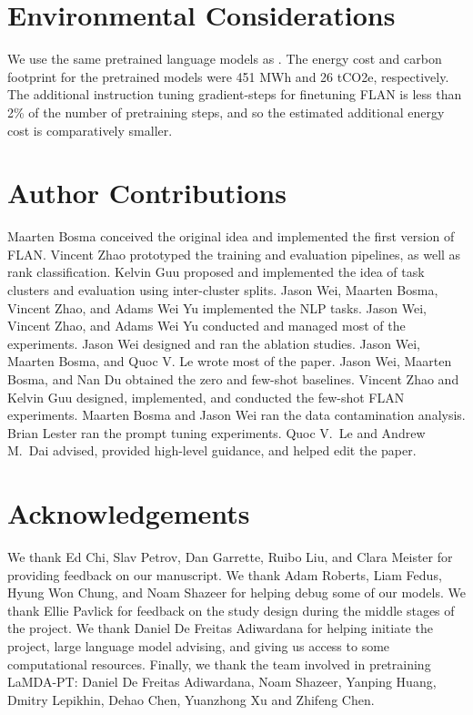 \documentclass{article} \usepackage{iclr2022_conference,times}
\newcommand{\flan}{FLAN}
\newcommand{\baselm}{LaMDA-PT}
\begin{document}
\section*{Environmental Considerations}
We use the same pretrained language models as \citet{Austin2021ProgramSW}. The energy cost and carbon footprint for the pretrained models were 451 MWh and 26 tCO2e, respectively. 
The additional instruction tuning gradient-steps for finetuning \flan{} is less than 2\% of the number of pretraining steps, and so the estimated additional energy cost is comparatively smaller.

\section*{Author Contributions}\label{sec:contributions}
Maarten Bosma conceived the original idea and implemented the first version of \flan. 
Vincent Zhao prototyped the training and evaluation pipelines, as well as rank classification. 
Kelvin Guu proposed and implemented the idea of task clusters and evaluation using inter-cluster splits. 
Jason Wei, Maarten Bosma, Vincent Zhao, and Adams Wei Yu implemented the NLP tasks. 
Jason Wei, Vincent Zhao, and Adams Wei Yu conducted and managed most of the experiments. 
Jason Wei designed and ran the ablation studies. 
Jason Wei, Maarten Bosma, and Quoc V. Le wrote most of the paper. 
Jason Wei, Maarten Bosma, and Nan Du obtained the zero and few-shot baselines. 
Vincent Zhao and Kelvin Guu designed, implemented, and conducted the few-shot FLAN experiments.
Maarten Bosma and Jason Wei ran the data contamination analysis.
Brian Lester ran the prompt tuning experiments. 
Quoc V.~Le and Andrew M.~Dai advised, provided high-level guidance, and helped edit the paper.

\section*{Acknowledgements}
We thank Ed Chi, Slav Petrov, Dan Garrette, Ruibo Liu, and Clara Meister for providing feedback on our manuscript. 
We thank Adam Roberts, Liam Fedus, Hyung Won Chung, and Noam Shazeer for helping debug some of our models. 
We thank Ellie Pavlick for feedback on the study design during the middle stages of the project.  
We thank Daniel De Freitas Adiwardana for helping initiate the project, large language model advising, and giving us access to some computational resources.
Finally, we thank the team involved in pretraining \baselm{}: Daniel De Freitas Adiwardana, Noam Shazeer, Yanping Huang, Dmitry Lepikhin, Dehao Chen, Yuanzhong Xu and Zhifeng Chen.
\end{document}
